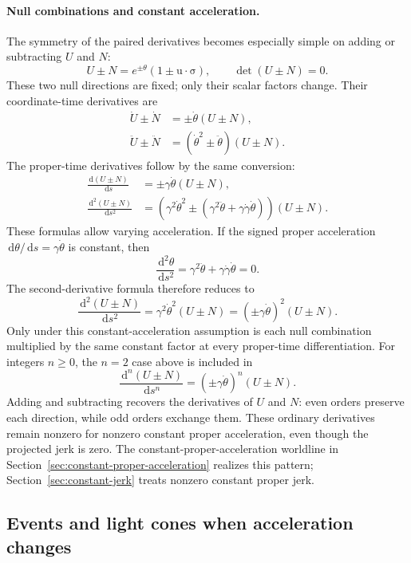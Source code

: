 \documentclass[11pt]{article}
\newcommand{\pv}[1]{{#1}}
\newcommand{\vstyle}[1]{{\bm{\mathrm{#1}}}}
\newcommand{\pN}{\pv{N}}
\newcommand{\pU}{\pv{U}}
\numberwithin{equation}{section}
\newcommand{\dotprod}{\cdot}
\newcommand{\bsig}{\vstyle{\sigma}}
\newcommand{\bu}{\vstyle{u}}
\newcommand{\dd}{\,\mathrm d}
\begin{document}
\paragraph{Null combinations and constant acceleration.}
The symmetry of the paired derivatives becomes especially simple on
adding or subtracting $\pU$ and $\pN$:
\[
 \pU\pm\pN=e^{\pm\theta}(1\pm\bu\dotprod\bsig),\qquad
 \det(\pU\pm\pN)=0.
\]
These two null directions are fixed; only their scalar factors change.
Their coordinate-time derivatives are
\begin{align*}
 \dot{\pU}\pm\dot{\pN}
 &=\pm\dot{\theta}(\pU\pm\pN),\\
 \ddot{\pU}\pm\ddot{\pN}
 &=(\dot{\theta}^2\pm\ddot{\theta})(\pU\pm\pN).
\end{align*}
The proper-time derivatives follow by the same conversion:
\begin{align*}
 \frac{\dd(\pU\pm\pN)}{\dd s}
 &=\pm\gamma\dot{\theta}(\pU\pm\pN),\\
 \frac{\dd^2(\pU\pm\pN)}{\dd s^2}
 &=(\gamma^2\dot{\theta}^2
 \pm(\gamma^2\ddot{\theta}+\gamma\dot{\gamma}\dot{\theta}))
 (\pU\pm\pN).
\end{align*}
These formulas allow varying acceleration. If the signed proper acceleration
$\dd\theta/\dd s=\gamma\dot{\theta}$ is constant, then
\[
 \frac{\dd^2\theta}{\dd s^2}
 =\gamma^2\ddot{\theta}+\gamma\dot{\gamma}\dot{\theta}=0.
\]
The second-derivative formula therefore reduces to
\[
 \frac{\dd^2(\pU\pm\pN)}{\dd s^2}
 =\gamma^2\dot{\theta}^2(\pU\pm\pN)
 =(\pm\gamma\dot{\theta})^2(\pU\pm\pN).
\]
Only under this constant-acceleration assumption is each null combination
multiplied by the same constant factor at every proper-time differentiation.
For integers $n\ge0$, the $n=2$ case above is included in
\[
 \frac{\dd^n(\pU\pm\pN)}{\dd s^n}
 =(\pm\gamma\dot{\theta})^n(\pU\pm\pN).
\]
Adding and subtracting recovers the derivatives of $\pU$ and $\pN$:
even orders preserve each direction, while odd orders exchange them.
These ordinary derivatives remain nonzero for nonzero constant proper
acceleration, even though the projected jerk is zero.
The constant-proper-acceleration worldline in
Section~\ref{sec:constant-proper-acceleration} realizes this pattern;
Section~\ref{sec:constant-jerk} treats nonzero constant proper jerk.

\subsection{Events and light cones when acceleration changes}
\label{sec:jerking-events}
\end{document}
